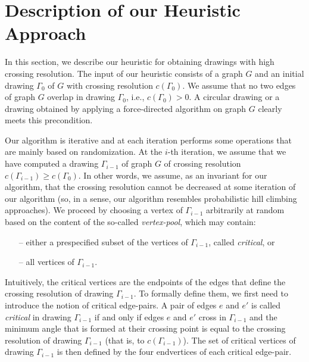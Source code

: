 \documentclass{comjnl}
\begin{document}
\section{Description of our Heuristic Approach}
\label{sec:algorithm}

In this section, we describe our heuristic for obtaining drawings with high crossing resolution. The input of our heuristic consists of a graph $G$ and an initial drawing $\Gamma_0$ of $G$ with crossing resolution $c(\Gamma_0)$. We assume that no two edges of graph $G$ overlap in drawing $\Gamma_0$, i.e., $c(\Gamma_0)>0$. A circular drawing or a drawing obtained by applying a force-directed algorithm on graph $G$ clearly meets this precondition.

Our algorithm is iterative and at each iteration performs some operations that are mainly based on randomization. At the $i$-th iteration, we assume that we have computed a drawing $\Gamma_{i-1}$ of graph $G$ of crossing resolution $c(\Gamma_{i-1}) \geq c(\Gamma_0)$. In other words, we assume, as an invariant for our algorithm, that the crossing resolution cannot be decreased at some iteration of our algorithm (so, in a sense, our algorithm resembles probabilistic hill climbing approaches). We proceed by choosing a vertex of $\Gamma_{i-1}$ arbitrarily at random based on the content of the so-called \emph{vertex-pool}, which may contain:

\begin{itemize}
\item[--] either a prespecified subset of the vertices of $\Gamma_{i-1}$, called \emph{critical}, or
\item[--] all vertices of $\Gamma_{i-1}$.
\end{itemize}

Intuitively, the critical vertices are the endpoints of the edges that define the crossing resolution of drawing $\Gamma_{i-1}$. To formally define them, we first need to introduce the notion of critical edge-pairs. A pair of edges $e$ and $e'$ is called \emph{critical} in drawing $\Gamma_{i-1}$ if and only if edges $e$ and $e'$ cross in $\Gamma_{i-1}$ and the minimum angle that is formed at their crossing point is equal to the crossing resolution of drawing $\Gamma_{i-1}$ (that is, to $c(\Gamma_{i-1})$). The set of critical vertices of drawing $\Gamma_{i-1}$ is then defined by the four endvertices of each critical edge-pair.
\end{document}
